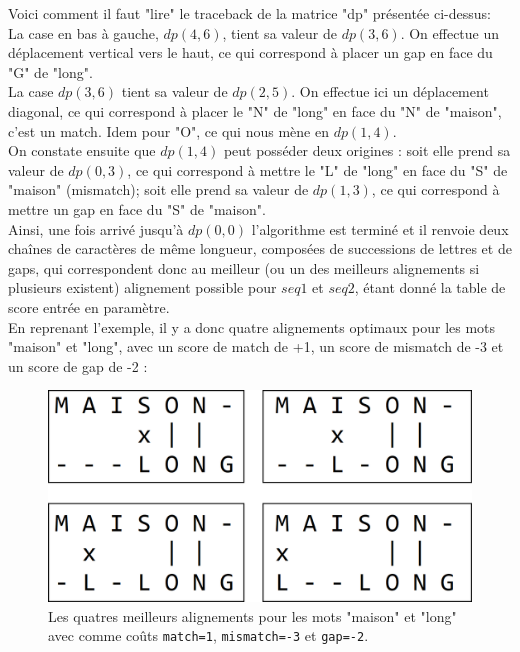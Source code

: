 \documentclass[12pt]{article}
\begin{document}
\newpage

Voici comment il faut "lire" le traceback de la matrice "dp" présentée ci-dessus:\\
La case en bas à gauche, $dp(4,6)$, tient sa valeur de $dp(3,6)$. On effectue un déplacement vertical vers le haut, ce qui correspond à placer un gap en face du "G" de "long".\\
La case $dp(3,6)$ tient sa valeur de $dp(2,5)$. On effectue ici un déplacement diagonal, ce qui correspond à placer le "N" de "long" en face du "N" de "maison", c'est un match. Idem pour "O", ce qui nous mène en $dp(1,4)$.\\

On constate ensuite que $dp(1,4)$ peut posséder deux origines : soit elle prend sa valeur de $dp(0,3)$, ce qui correspond à mettre le "L" de "long" en face du "S" de "maison" (mismatch); soit elle prend sa valeur de $dp(1,3)$, ce qui correspond à mettre un gap en face du "S" de "maison".\\

Ainsi, une fois arrivé jusqu'à $dp(0,0)$ l'algorithme est terminé et il renvoie deux chaînes de caractères de même longueur, composées de successions de lettres et de gaps, qui correspondent donc au meilleur (ou un des meilleurs alignements si plusieurs existent) alignement possible pour $seq1$ et $seq2$, étant donné la table de score entrée en paramètre.\\

En reprenant l'exemple, il y a donc quatre alignements optimaux pour les mots "maison" et "long", avec un score de match de +1, un score de mismatch de -3 et un score de gap de -2 :

\begin{figure}[!h]
    \centering
    \includegraphics[scale = 0.5]{Images/Needleman/alignements needleman.png}
    \caption{Les quatres meilleurs alignements pour les mots "maison" et "long" avec comme coûts \texttt{match=1}, \texttt{mismatch=-3} et \texttt{gap=-2}.}
    \label{fig:Matrice "dp" remplis pour les mots "maison" et "long" en utilisant la table de coûts illustrée.}
\end{figure}
\end{document}
